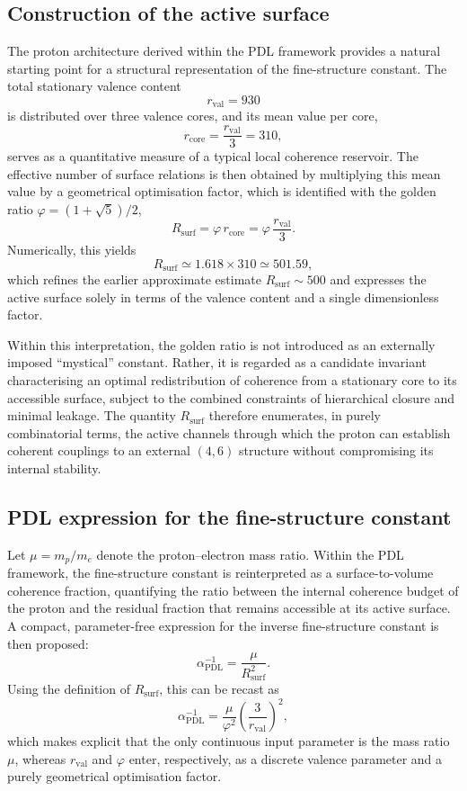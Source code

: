 \documentclass[12pt,a4paper]{article}
\begin{document}
\subsection{Construction of the active surface}

The proton architecture derived within the PDL framework provides a natural starting point for a structural representation of the fine-structure constant.
The total stationary valence content
\[
  r_{\text{val}} = 930
\]
is distributed over three valence cores, and its mean value per core,
\[
  r_{\text{core}} = \frac{r_{\text{val}}}{3} = 310,
\]
serves as a quantitative measure of a typical local coherence reservoir.
The effective number of surface relations is then obtained by multiplying this mean value by a geometrical optimisation factor, which is identified with the golden ratio \(\varphi = (1+\sqrt{5})/2\),
\[
  R_{\text{surf}} = \varphi\,r_{\text{core}} = \varphi\,\frac{r_{\text{val}}}{3}.
\]
Numerically, this yields
\[
  R_{\text{surf}} \simeq 1.618\times 310 \simeq 501.59,
\]
which refines the earlier approximate estimate \(R_{\text{surf}}\sim 500\) and expresses the active surface solely in terms of the valence content and a single dimensionless factor.\cite{Laubscher2026LDP_French,Laubscher2026PDL_English}

Within this interpretation, the golden ratio is not introduced as an externally imposed “mystical” constant.
Rather, it is regarded as a candidate invariant characterising an optimal redistribution of coherence from a stationary core to its accessible surface, subject to the combined constraints of hierarchical closure and minimal leakage.
The quantity \(R_{\text{surf}}\) therefore enumerates, in purely combinatorial terms, the active channels through which the proton can establish coherent couplings to an external \((4,6)\) structure without compromising its internal stability.

\subsection{PDL expression for the fine-structure constant}

Let \(\mu = m_p/m_e\) denote the proton–electron mass ratio.
Within the PDL framework, the fine-structure constant is reinterpreted as a surface-to-volume coherence fraction, quantifying the ratio between the internal coherence budget of the proton and the residual fraction that remains accessible at its active surface.
A compact, parameter-free expression for the inverse fine-structure constant is then proposed:
\[
  \alpha_{\text{PDL}}^{-1}
  =
  \frac{\mu}{R_{\text{surf}}^2}.
\]
Using the definition of \(R_{\text{surf}}\), this can be recast as
\[
  \alpha_{\text{PDL}}^{-1}
  =
  \frac{\mu}{\varphi^2}\left(\frac{3}{r_{\text{val}}}\right)^2,
\]
which makes explicit that the only continuous input parameter is the mass ratio \(\mu\), whereas \(r_{\text{val}}\) and \(\varphi\) enter, respectively, as a discrete valence parameter and a purely geometrical optimisation factor.\cite{Laubscher2026PDL_English,Laubscher2026LDP_French}
\end{document}
